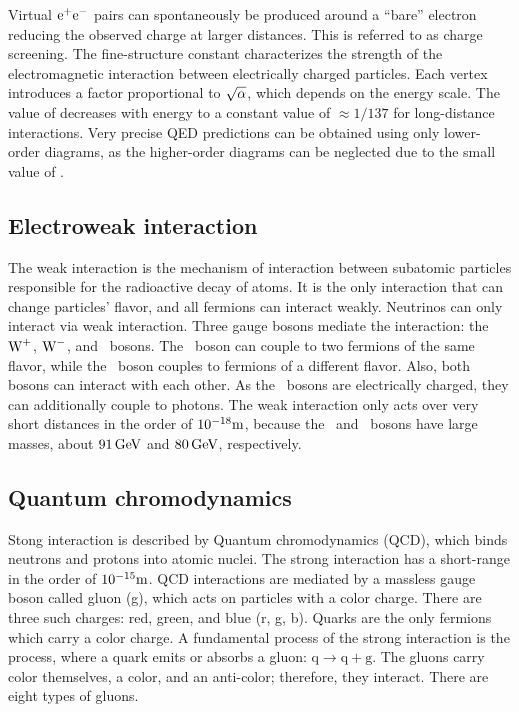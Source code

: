 Virtual $\text{e}^{+} \text{e}^{-}$ pairs can spontaneously be produced around a ``bare'' electron reducing the observed charge at larger distances. This is referred to as charge screening. The fine-structure constant \aem characterizes the strength of the electromagnetic interaction between electrically charged particles. Each vertex introduces a factor proportional to $\sqrt{\alpha}$, which depends on the energy scale. The value of \aem decreases with energy to a constant value of $\approx 1/137$ for long-distance interactions. Very precise QED predictions can be obtained using only lower-order diagrams, as the higher-order diagrams can be neglected due to the small value of \aem.

\subsection{Electroweak interaction}

The weak interaction is the mechanism of interaction between subatomic particles responsible for the radioactive decay of atoms. It is the only interaction that can change particles' flavor, and all fermions can interact weakly. Neutrinos can only interact via weak interaction. Three gauge bosons mediate the interaction: the $\text{W}^{+}$, $\text{W}^{-}$, and \PZ\, bosons. The \PZ\, boson can couple to two fermions of the same flavor, while the \PW\, boson couples to fermions of a different flavor. Also, both bosons can interact with each other. As the \PW\, bosons are electrically charged, they can additionally couple to photons. The weak interaction only acts over very short distances in the order of $10^{-18} \text{m}$, because the \PZ\, and \PW\, bosons have large masses, about $91 \,\text{Ge\hspace{-.08em}V}$ and $80 \,\text{Ge\hspace{-.08em}V}$, respectively.

\subsection{Quantum chromodynamics}

Stong interaction is described by Quantum chromodynamics (QCD), which binds neutrons and protons into atomic nuclei. The strong interaction has a short-range in the order of $10^{-15} \text{m}$. QCD interactions are mediated by a massless gauge boson called gluon (g), which acts on particles with a color charge. There are three such charges: red, green, and blue (r, g, b). Quarks are the only fermions which carry a color charge. A fundamental process of the strong interaction is the process, where a quark emits or absorbs a gluon: $\mathrm{q} \to \mathrm{q} + \mathrm{g}$. The gluons carry color themselves, a color, and an anti-color; therefore, they interact. There are eight types of gluons.

